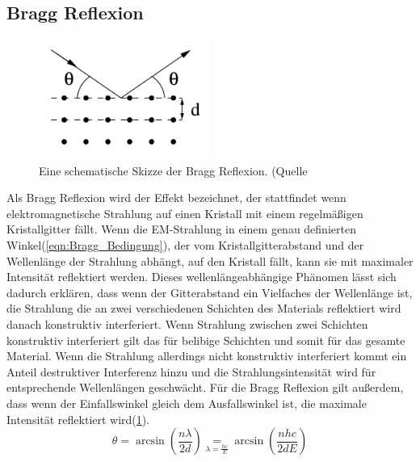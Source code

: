 \subsection{Bragg Reflexion}
\begin{figure}
    \centering
    \includegraphics[width=0.5\textwidth]{bilder/Bragg_Reflexion.png}
    \caption{Eine schematische Skizze der Bragg Reflexion. (Quelle \cite{Anleitung}}
    \label{fig:Bragg_Reflexion}
\end{figure}
Als Bragg Reflexion wird der Effekt bezeichnet, der stattfindet wenn elektromagnetische Strahlung auf einen Kristall mit einem regelmäßigen Kristallgitter fällt.
Wenn die EM-Strahlung in einem genau definierten Winkel(\ref{eqn:Bragg_Bedingung}), der vom Kristallgitterabstand und der Wellenlänge der Strahlung abhängt, auf den Kristall fällt, kann sie mit maximaler Intensität reflektiert werden.
Dieses wellenlängeabhängige Phänomen lässt sich dadurch erklären, dass wenn der Gitterabstand ein Vielfaches der Wellenlänge ist, die Strahlung die an zwei verschiedenen Schichten des Materials reflektiert wird danach konstruktiv interferiert.
Wenn Strahlung zwischen zwei Schichten konstruktiv interferiert gilt das für belibige Schichten und somit für das gesamte Material.
Wenn die Strahlung allerdings nicht konstruktiv interferiert kommt ein Anteil destruktiver Interferenz hinzu und die Strahlungsintensität wird für entsprechende Wellenlängen geschwächt.
Für die Bragg Reflexion gilt außerdem, dass wenn der Einfallswinkel gleich dem Ausfallswinkel ist, die maximale Intensität reflektiert wird(\ref{fig:Bragg_Reflexion}).
\begin{equation}
    \theta = \arcsin\left( \frac{n\lambda}{2d}\right) \underset{\lambda = \frac{hc}{E}}{=} \arcsin\left( \frac{n h c}{2dE}\right) \label{eqn:Bragg_Bedingung}
\end{equation}
